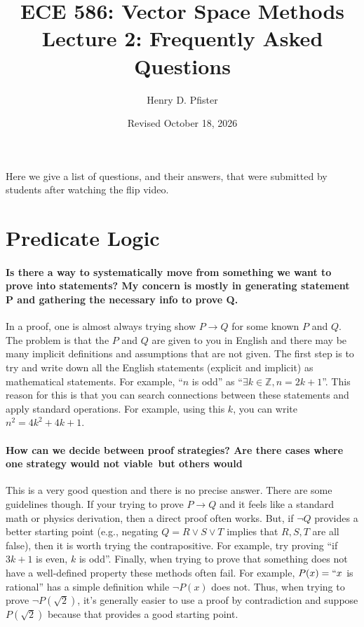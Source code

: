 \documentclass[10pt,english]{article}
\begin{document}
\title{ECE 586: Vector Space Methods \\ Lecture 2: Frequently Asked Questions}
\author{Henry D. Pfister \\ \univ}
\date{Revised October 18, 2026}

\maketitle

Here we give a list of questions, and their answers, that were submitted by students after watching the flip video.

\section{Predicate Logic}

\paragraph{Is there a way to systematically move from something we want to prove into statements? My concern is mostly in generating statement P and gathering the necessary info to prove Q.}

In a proof, one is almost always trying show $P \rightarrow Q$ for some known $P$ and $Q$.  The problem is that the $P$ and $Q$ are given to you in English and there may be many implicit definitions and assumptions that are not given.  The first step is to try and write down all the English statements (explicit and implicit) as mathematical statements.  For example, ``$n$ is odd'' as ``$\exists k \in \mathbb{Z}, n = 2k+1$''.  This reason for this is that you can search connections between these statements and apply standard operations.  For example, using this $k$, you can write $n^2 = 4k^2 + 4k + 1$.

\paragraph{How can we decide between proof strategies? Are there cases where one strategy would not viable but others would}

This is a very good question and there is no precise answer.  There are some guidelines though.  If your trying to prove $P \to Q$ and it feels like a standard math or physics derivation, then a direct proof often works.  But, if $\neg Q$ provides a better starting point (e.g., negating $Q = R \vee S \vee T$ implies that $R,S,T$ are all false), then it is worth trying the contrapositive.  For example, try proving ``if $3k+1$ is even, $k$ is odd''.  Finally, when trying to prove that something does not have a well-defined property these methods often fail.  For example, $P(x)=``x$ is rational'' has a simple definition while $\neg P(x)$ does not.  Thus, when trying to prove $\neg P(\sqrt{2})$, it's generally easier to use a proof by contradiction and suppose $P(\sqrt{2})$ because that provides a good starting point.
\end{document}
